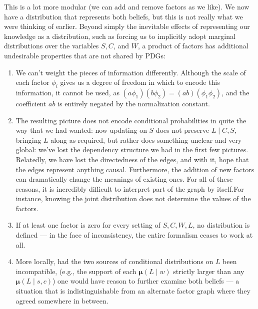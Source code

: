 \documentclass{article}
\newcommand\bmu{\boldsymbol{\mu}}
\newcommand{\MN}{PDG}
\newcommand{\MNs}{\MN s}
\begin{document}
	This is a lot more modular (we can add and remove factors as we like). We now have a distribution that represents both beliefs, but this is not really what we were thinking of earlier. Beyond simply the inevitable effects of representing our knowledge as a distribution, such as forcing us to implicitly adopt marginal distributions over the variables $S,C$, and $W$, a product of factors has additional undesirable properties that are not shared by \MNs:

	\begin{enumerate}
		\item We can't weight the pieces of information differently. Although the scale of each factor $\phi_i$ gives us a degree of freedom in which to encode this information, it cannot be used, as $(a\phi_1) (b\phi_2) = (ab) (\phi_1\phi_2)$, and the coefficient $ab$ is entirely negated by the normalization constant.			

		\item The resulting picture does not encode conditional probabilities in quite the way that we had wanted: now updating on $S$ does not preserve $L\mid C,S$, bringing $L$ along as required, but rather does something unclear and very global: we've lost the dependency structure we had in the first few pictures. Relatedly, we have lost the directedness of the edges, and with it, hope that the edges represent anything causal. Furthermore, the addition of new factors can dramatically change the meanings of existing ones. 
		For all of these reasons, it is incredibly difficult to interpret part of the graph by itself.For instance, knowing the joint distribution does not determine the values of the factors.
		
		\item If at least one factor is zero for every setting of $S,C,W,L$, no distribution is defined --- in the face of inconsistency, the entire formalism ceases to work at all.
		
		\item More locally, had the two sources of conditional distributions on $L$ been incompatible, (e.g., the support of each $\bmu(L\mid w)$ strictly larger than any $\bmu(L\mid s,c)$) one would have reason to further examine both beliefs --- a situation that is indistinguishable from an alternate factor graph where they agreed somewhere in between.	
	\end{enumerate}		
	
\end{document}
